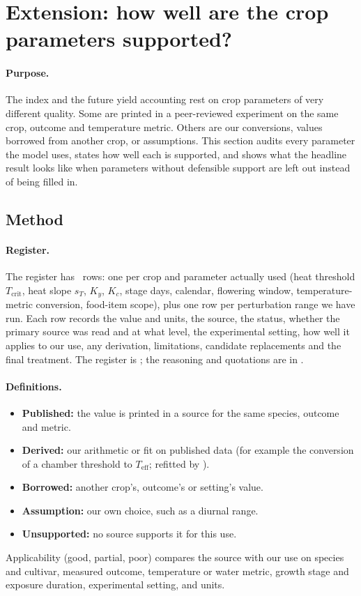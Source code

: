 \section{Extension: how well are the crop parameters supported?}\label{sec:parevidence}
\paragraph{Purpose.} The index and the future yield accounting rest on crop parameters of very different quality.
Some are printed in a peer-reviewed experiment on the same crop, outcome and temperature metric. Others are our
conversions, values borrowed from another crop, or assumptions. This section audits every parameter the model uses,
states how well each is supported, and shows what the headline result looks like when parameters without defensible
support are left out instead of being filled in.

\subsection{Method}
\paragraph{Register.} The register has \parNRows\ rows: one per crop and parameter actually used (heat threshold
$T_{\text{crit}}$, heat slope $s_T$, $K_y$, $K_c$, stage days, calendar, flowering window, temperature-metric
conversion, food-item scope), plus one row per perturbation range we have run. Each row records the value and units,
the source, the status, whether the primary source was read and at what level, the experimental setting, how well it
applies to our use, any derivation, limitations, candidate replacements and the final treatment. The register is
; the reasoning and quotations are in
.

\paragraph{Definitions.}
\begin{itemize}
\item \textbf{Published:} the value is printed in a source for the same species, outcome and metric.
\item \textbf{Derived:} our arithmetic or fit on published data (for example the conversion of a chamber threshold to
$T_{\text{eff}}$; refitted by ).
\item \textbf{Borrowed:} another crop's, outcome's or setting's value.
\item \textbf{Assumption:} our own choice, such as a diurnal range.
\item \textbf{Unsupported:} no source supports it for this use.
\end{itemize}
Applicability (good, partial, poor) compares the source with our use on species and cultivar, measured outcome,
temperature or water metric, growth stage and exposure duration, experimental setting, and units.

